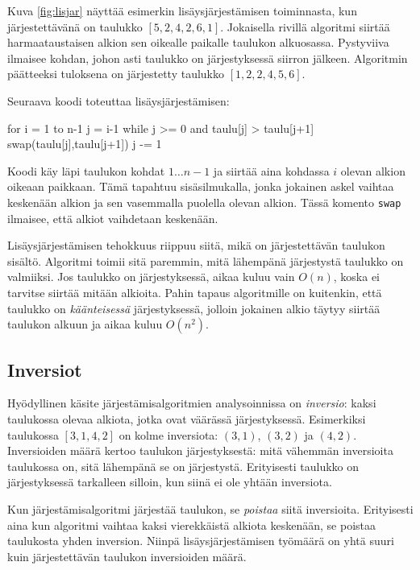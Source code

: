 Kuva \ref{fig:lisjar} näyttää esimerkin lisäysjärjestämisen
toiminnasta, kun järjes\-tettävänä on taulukko $[5,2,4,2,6,1]$.
Jokaisella rivillä algoritmi siirtää harmaataustaisen
alkion sen oikealle paikalle taulukon alkuosassa.
Pystyviiva ilmaisee kohdan, johon asti taulukko on järjestyksessä
siirron jälkeen.
Algoritmin päätteeksi tuloksena on järjestetty taulukko $[1,2,2,4,5,6]$.

Seuraava koodi toteuttaa lisäysjärjestämisen:

\begin{code}
for i = 1 to n-1
    j = i-1
    while j >= 0 and taulu[j] > taulu[j+1]
        swap(taulu[j],taulu[j+1])
        j -= 1
\end{code}

Koodi käy läpi taulukon kohdat $1 \dots n-1$
ja siirtää aina kohdassa $i$ olevan alkion
oikeaan paikkaan.
Tämä tapahtuu sisäsilmukalla,
jonka jokainen askel vaihtaa keskenään alkion
ja sen vasemmalla puolella olevan alkion.
Tässä komento \texttt{swap} ilmaisee,
että alkiot vaihdetaan keskenään.

Lisäysjärjestämisen tehokkuus riippuu siitä,
mikä on järjestettävän taulukon sisältö.
Algoritmi toimii sitä paremmin, mitä lähempänä järjestystä
taulukko on valmiiksi.
Jos taulukko on järjestyksessä,
aikaa kuluu vain $O(n)$, koska ei tarvitse siirtää
mitään alkioita.
Pahin tapaus algoritmille on kuitenkin, että taulukko on
\emph{käänteisessä} järjestyksessä,
jolloin jokainen alkio täytyy siirtää
taulukon alkuun ja aikaa kuluu $O(n^2)$.

\subsection{Inversiot}


Hyödyllinen käsite järjestämisalgoritmien analysoinnissa
on \emph{inversio}: kaksi taulukossa olevaa alkiota,
jotka ovat väärässä järjestyksessä.
Esimerkiksi taulukossa $[3,1,4,2]$ on kolme inversiota:
$(3,1)$, $(3,2)$ ja $(4,2)$.
Inversioiden määrä kertoo taulukon järjestyksestä:
mitä vähemmän inversioita taulukossa on,
sitä lähempänä se on järjestystä.
Erityisesti taulukko on järjestyksessä tarkalleen silloin,
kun siinä ei ole yhtään inversiota.

Kun järjestämisalgoritmi järjestää taulukon,
se \emph{poistaa} siitä inversioita.
Erityisesti aina kun
algoritmi vaihtaa kaksi vierekkäistä alkiota keskenään,
se poistaa taulukosta yhden inversion.
Niinpä lisäysjärjestämisen työmäärä on yhtä suuri
kuin järjestettävän taulukon inversioiden määrä.

